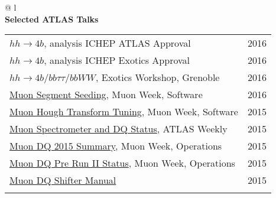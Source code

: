 \documentclass[letterpaper,11pt,oneside]{article}
\newcommand{\blue}[1]{\textcolor[rgb]{0,0,0.9}{#1}}
\begin{document}
\begin{flushleft}
\begin{tabular}{@{} l}
     \\
     \textbf{Selected ATLAS Talks} \\
     \begin{tabular}{@{} l l }
     \blue{\href{https://indico.cern.ch/event/558982/contributions/2255258}{$hh\to4b$}}, analysis ICHEP ATLAS Approval & 2016\\
     \blue{\href{https://indico.cern.ch/event/556566/contributions/2244051}{$hh\to4b$}}, analysis ICHEP Exotics Approval & 2016\\
     \blue{\href{https://indico.cern.ch/event/465157/contributions/1972449}{$hh\to4b / bb\tau\tau / bbWW$}}, Exotics Workshop, Grenoble & 2016\\
      \blue{\href{https://indico.cern.ch/event/570115/contributions/2305843}{Muon Segment Seeding}}, Muon Week, Software & 2016\\
     \blue{\href{https://indico.cern.ch/event/465396/contributions/1984207}{Muon Hough Transform Tuning}}, Muon Week, Software & 2015\\
     \blue{\href{https://indico.cern.ch/event/444054/contributions/1099850}{Muon Spectrometer and DQ Status}}, ATLAS Weekly & 2015\\
     \blue{\href{https://indico.cern.ch/event/464848/contributions/1983327}{Muon DQ 2015 Summary}}, Muon Week, Operations & 2015\\
     \blue{\href{https://indico.cern.ch/event/376175/contributions/893495}{Muon DQ Pre Run II Status}}, Muon Week, Operations & 2015\\
     \blue{\href{https://twiki.cern.ch/twiki/pub/Atlas/MuonOfflineDQShiftInstructions/Muondq_instruction_tony_2015spring.pdf}{Muon DQ Shifter Manual}} & 2015\\
     \hspace{0.8\linewidth} & \hspace{0.1\linewidth} \\
      \end{tabular}
      \end{tabular}
\end{flushleft}
\end{document}
